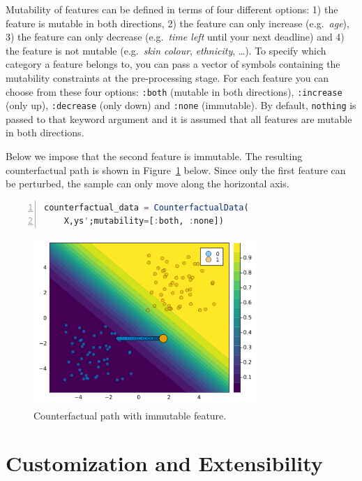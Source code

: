\documentclass{juliacon}
\begin{document}
Mutability of features can be defined in terms of four different
options: 1) the feature is mutable in both directions, 2) the feature
can only increase (e.g.~\emph{age}), 3) the feature can only decrease
(e.g.~\emph{time left} until your next deadline) and 4) the feature is
not mutable (e.g.~\emph{skin colour}, \emph{ethnicity}, \ldots). To
specify which category a feature belongs to, you can pass a vector of
symbols containing the mutability constraints at the pre-processing
stage. For each feature you can choose from these four options:
\texttt{:both} (mutable in both directions), \texttt{:increase} (only
up), \texttt{:decrease} (only down) and \texttt{:none} (immutable). By
default, \texttt{nothing} is passed to that keyword argument and it is
assumed that all features are mutable in both directions.

Below we impose that the second feature is immutable. The resulting
counterfactual path is shown in Figure~\ref{fig-mutability} below. Since
only the first feature can be perturbed, the sample can only move along
the horizontal axis.

\begin{lstlisting}[language=Julia, escapechar=@, numbers=left]
counterfactual_data = CounterfactualData(
    X,ys';mutability=[:both, :none])
\end{lstlisting}

\begin{figure}

{\centering \includegraphics[width=3.33333in,height=2.5in]{www/constraint_mutability.png}

}

\caption{\label{fig-mutability}Counterfactual path with immutable
feature.}

\end{figure}

\hypertarget{customization-and-extensibility}{%
\section{Customization and
Extensibility}\label{customization-and-extensibility}}
\end{document}
